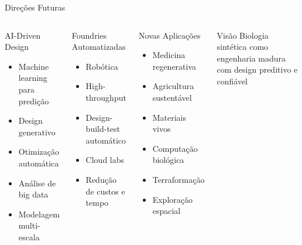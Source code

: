 \begin{frame}{Direções Futuras}
\begin{columns}
\begin{block}{AI-Driven Design}
\begin{itemize}
    \item Machine learning para predição
    \item Design generativo
    \item Otimização automática
    \item Análise de big data
    \item Modelagem multi-escala
\end{itemize}
\end{block}

\begin{block}{Foundries Automatizadas}
\begin{itemize}
    \item Robótica
    \item High-throughput
    \item Design-build-test automático
    \item Cloud labs
    \item Redução de custos e tempo
\end{itemize}
\end{block}

\begin{block}{Novas Aplicações}
\begin{itemize}
    \item Medicina regenerativa
    \item Agricultura sustentável
    \item Materiais vivos
    \item Computação biológica
    \item Terraformação
    \item Exploração espacial
\end{itemize}
\end{block}

\begin{exampleblock}{Visão}
Biologia sintética como engenharia madura com design preditivo e confiável
\end{exampleblock}
\end{columns}

\vspace{0.3cm}

\end{frame}

